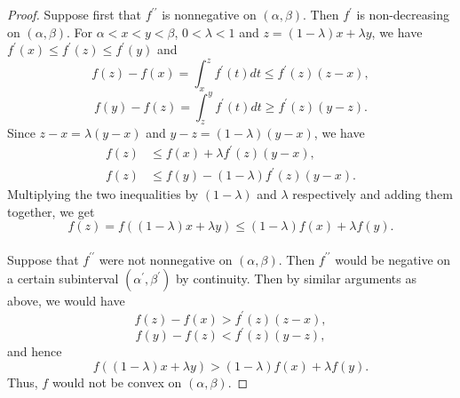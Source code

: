 \documentclass[11pt,a4paper]{article}
\begin{document}
\begin{proof}
    \converse Suppose first that $f^{\prime\prime}$ is nonnegative on $(\alpha,\beta)$. Then $f^\prime$ is non-decreasing on $(\alpha,\beta)$. For $\alpha<x<y<\beta$, $0<\lambda<1$ and $z = (1-\lambda)x+\lambda y$, we have $f^\prime(x)\le f^\prime (z)\le f^\prime(y)$ and
    \begin{equation*}
        f(z) - f(x) = \int_x^z f^\prime (t)dt \le f^\prime(z)(z-x), 
    \end{equation*}
    \begin{equation*}
        f(y) - f(z) = \int_z^y f^\prime (t)dt \ge f^\prime(z)(y-z). 
    \end{equation*}
    Since $z-x = \lambda(y-x)$ and $y-z = (1-\lambda)(y-x)$, we have
    \begin{align*}
        f(z)&\le f(x) + \lambda f^\prime(z)(y-x),\\
        f(z)&\le f(y) - (1-\lambda) f^\prime(z)(y-x).
    \end{align*}
    Multiplying the two inequalities by $(1-\lambda)$ and $\lambda$ respectively and adding them together, we get
    \begin{equation*}
        f(z) = f((1-\lambda)x + \lambda y) \le (1-\lambda)f(x) + \lambda f(y).
    \end{equation*}
    \\
    \forward Suppose that $f^{\prime\prime}$ were not nonnegative on $(\alpha,\beta)$. Then $f^{\prime\prime}$ would be negative on a certain subinterval $(\alpha^\prime,\beta^\prime)$ by continuity. Then by similar arguments as above, we would have
    \begin{equation*}
        f(z) - f(x) > f^\prime (z)(z-x),
    \end{equation*} 
    \begin{equation*}
        f(y) - f(z) < f^\prime (z)(y-z),
    \end{equation*} 
    and hence 
    \begin{equation*}
        f((1-\lambda)x + \lambda y) > (1-\lambda)f(x) + \lambda f(y).
    \end{equation*}
    Thus, $f$ would not be convex on $(\alpha,\beta)$.
\end{proof}
\end{document}
